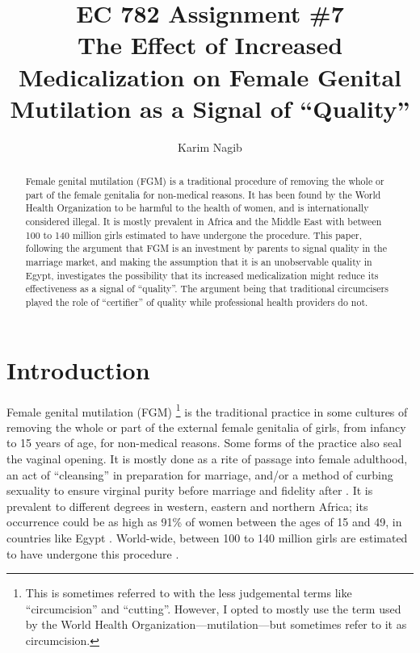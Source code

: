 \documentclass[12pt]{article}
\title{EC 782 Assignment \#7 \\ The Effect of Increased Medicalization on Female Genital Mutilation as a Signal of ``Quality''}
\author{Karim Nagib}
\begin{document}
\maketitle

  \begin{abstract}
    Female genital mutilation (FGM) is a traditional procedure of removing the whole or part of the female genitalia for non-medical reasons.  It has been found by the World Health Organization to be harmful to the health of women, and is internationally considered illegal.  It is mostly prevalent in Africa and the Middle East with between 100 to 140 million girls estimated to have undergone the procedure.  This paper, following the argument that FGM is an investment by parents to signal quality in the marriage market, and making the assumption that it is an unobservable quality in Egypt, investigates the possibility that its increased medicalization might reduce its effectiveness as a signal of ``quality''.  The argument being that traditional circumcisers played the role of ``certifier'' of quality while professional health providers do not.
  \end{abstract}

\section{Introduction}

Female genital mutilation (FGM) \footnote{This is sometimes referred to with the less judgemental terms like ``circumcision'' and ``cutting''. However, I opted to mostly use the term used by the World Health Organization---mutilation---but sometimes refer to it as circumcision.} is the traditional practice in some cultures of removing the whole or part of the external female genitalia of girls, from infancy to 15 years of age, for non-medical reasons. Some forms of the practice also seal the vaginal opening. It is mostly done as a rite of passage into female adulthood, an act of ``cleansing'' in preparation for marriage, and/or a method of curbing sexuality to ensure virginal purity before marriage and fidelity after \citep{whofs241}. It is prevalent to different degrees in western, eastern and northern Africa; its occurrence could be as high as 91\% of women between the ages of 15 and 49, in countries like Egypt \citep{whoprev, El-Zanat}. World-wide, between 100 to 140 million girls are estimated to have undergone this procedure \citep{whofs241}.
\end{document}
